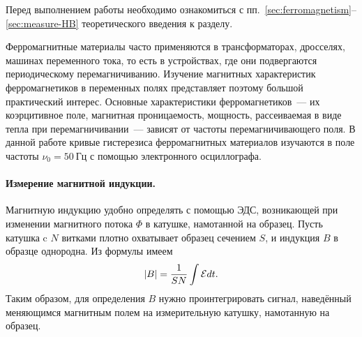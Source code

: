\label{lab:4-5}



Перед выполнением работы необходимо ознакомиться с
пп.~\ref{sec:ferromagnetism}--\ref{sec:measure-HB} теоретического введения к
разделу.

Ферромагнитные материалы часто применяются в трансформаторах, дросселях, машинах
переменного тока, то есть в устройствах, где они подвергаются периодическому
перемагничиванию. Изучение магнитных характеристик ферромагнетиков в переменных
полях представляет поэтому большой практический интерес. Основные характеристики
ферромагнетиков~--- их коэрцитивное поле, магнитная проницаемость, мощность,
рассеиваемая в виде тепла при перемагничивании~--- зависят
от частоты перемагничивающего поля. В данной работе
кривые гистерезиса ферромагнитных материалов изучаются в поле частоты
$\nu_0 = 50~Гц$ с помощью электронного осциллографа.

\paragraph{Измерение магнитной индукции.}
Магнитную индукцию удобно определять с
помощью ЭДС, возникающей при изменении магнитного потока $\Phi$ в катушке,
намотанной на образец.
Пусть катушка c $N$ витками плотно охватывает образец сечением $S$, и индукция $B$ в образце однородна.
Из формулы 
имеем
%
%
\begin{equation}
	\eqmark{4.5.2}
	|B| = \frac{1}{SN}\int \mathcal{E}dt.
\end{equation}
Таким образом, для определения $B$ нужно проинтегрировать сигнал, наведённый
меняющимся магнитным полем на измерительную катушку, намотанную на образец.

